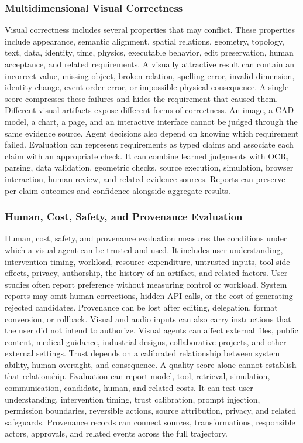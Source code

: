 \subsubsection{Multidimensional Visual Correctness}

Visual correctness includes several properties that may conflict. These properties include appearance, semantic alignment, spatial relations, geometry, topology, text, data, identity, time, physics, executable behavior, edit preservation, human acceptance, and related requirements. A visually attractive result can contain an incorrect value, missing object, broken relation, spelling error, invalid dimension, identity change, event-order error, or impossible physical consequence. A single score compresses these failures and hides the requirement that caused them. Different visual artifacts expose different forms of correctness. An image, a CAD model, a chart, a page, and an interactive interface cannot be judged through the same evidence source. Agent decisions also depend on knowing which requirement failed. Evaluation can represent requirements as typed claims and associate each claim with an appropriate check. It can combine learned judgments with OCR, parsing, data validation, geometric checks, source execution, simulation, browser interaction, human review, and related evidence sources. Reports can preserve per-claim outcomes and confidence alongside aggregate results.


\subsubsection{Human, Cost, Safety, and Provenance Evaluation}

Human, cost, safety, and provenance evaluation measures the conditions under which a visual agent can be trusted and used. It includes user understanding, intervention timing, workload, resource expenditure, untrusted inputs, tool side effects, privacy, authorship, the history of an artifact, and related factors. User studies often report preference without measuring control or workload. System reports may omit human corrections, hidden API calls, or the cost of generating rejected candidates. Provenance can be lost after editing, delegation, format conversion, or rollback. Visual and audio inputs can also carry instructions that the user did not intend to authorize. Visual agents can affect external files, public content, medical guidance, industrial designs, collaborative projects, and other external settings. Trust depends on a calibrated relationship between system ability, human oversight, and consequence. A quality score alone cannot establish that relationship. Evaluation can report model, tool, retrieval, simulation, communication, candidate, human, and related costs. It can test user understanding, intervention timing, trust calibration, prompt injection, permission boundaries, reversible actions, source attribution, privacy, and related safeguards. Provenance records can connect sources, transformations, responsible actors, approvals, and related events across the full trajectory.


